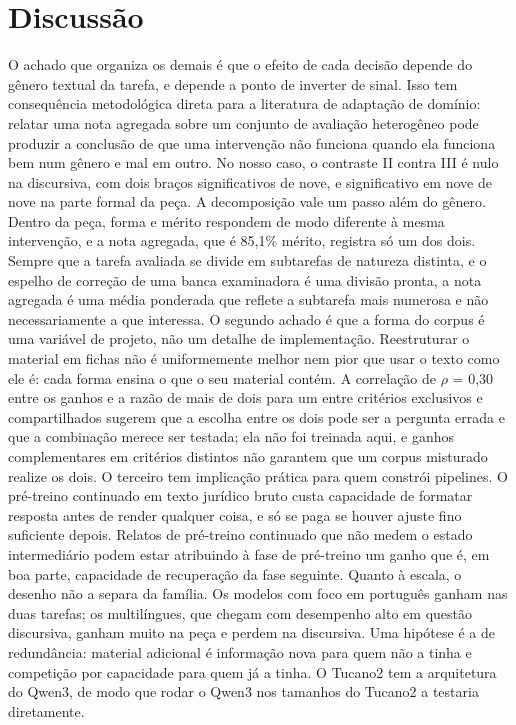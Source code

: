 \documentclass{IOS-Book-Article}
\begin{document}
\section{Discussão}
O achado que organiza os demais é que o efeito de cada decisão depende do gênero textual da tarefa, e depende a ponto de inverter de sinal. Isso tem consequência metodológica direta para a literatura de adaptação de domínio: relatar uma nota agregada sobre um conjunto de avaliação heterogêneo pode produzir a conclusão de que uma intervenção não funciona quando ela funciona bem num gênero e mal em outro. No nosso caso, o contraste II contra III é nulo na discursiva, com dois braços significativos de nove, e significativo em nove de nove na parte formal da peça.
A decomposição vale um passo além do gênero. Dentro da peça, forma e mérito respondem de modo diferente à mesma intervenção, e a nota agregada, que é 85,1\% mérito, registra só um dos dois. Sempre que a tarefa avaliada se divide em subtarefas de natureza distinta, e o espelho de correção de uma banca examinadora é uma divisão pronta, a nota agregada é uma média ponderada que reflete a subtarefa mais numerosa e não necessariamente a que interessa.
O segundo achado é que a forma do corpus é uma variável de projeto, não um detalhe de implementação. Reestruturar o material em fichas não é uniformemente melhor nem pior que usar o texto como ele é: cada forma ensina o que o seu material contém. A correlação de $\rho$ = 0,30 entre os ganhos e a razão de mais de dois para um entre critérios exclusivos e compartilhados sugerem que a escolha entre os dois pode ser a pergunta errada e que a combinação merece ser testada; ela não foi treinada aqui, e ganhos complementares em critérios distintos não garantem que um corpus misturado realize os dois.
O terceiro tem implicação prática para quem constrói pipelines. O pré-treino continuado em texto jurídico bruto custa capacidade de formatar resposta antes de render qualquer coisa, e só se paga se houver ajuste fino suficiente depois. Relatos de pré-treino continuado que não medem o estado intermediário podem estar atribuindo à fase de pré-treino um ganho que é, em boa parte, capacidade de recuperação da fase seguinte.
Quanto à escala, o desenho não a separa da família. Os modelos com foco em português ganham nas duas tarefas; os multilíngues, que chegam com desempenho alto em questão discursiva, ganham muito na peça e perdem na discursiva. Uma hipótese é a de redundância: material adicional é informação nova para quem não a tinha e competição por capacidade para quem já a tinha. O Tucano2 tem a arquitetura do Qwen3, de modo que rodar o Qwen3 nos tamanhos do Tucano2 a testaria diretamente.
\end{document}
